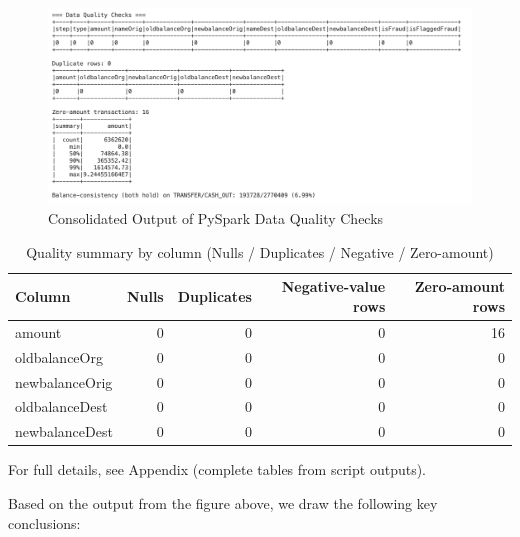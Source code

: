 \documentclass[sigplan,screen]{acmart}
\begin{document}
\begin{figure}[h]
  \centering
  \includegraphics[width=\textwidth]{Figure/2.4a.png}
  \caption{Consolidated Output of PySpark Data Quality Checks}
  \label{fig:data-quality-checks}
\end{figure}

\begin{table}[h]
\centering
\caption{Quality summary by column (Nulls / Duplicates / Negative / Zero-amount)}
\label{tab:data-quality-mini}
\begin{tabular}{|l|r|r|r|r|}
\hline
\textbf{Column} & \textbf{Nulls} & \textbf{Duplicates} & \textbf{Negative-value rows} & \textbf{Zero-amount rows} \\
\hline
amount & 0 & 0 & 0 & 16 \\
oldbalanceOrg & 0 & 0 & 0 & 0 \\
newbalanceOrig & 0 & 0 & 0 & 0 \\
oldbalanceDest & 0 & 0 & 0 & 0 \\
newbalanceDest & 0 & 0 & 0 & 0 \\
\hline
\end{tabular}
\end{table}

For full details, see Appendix (complete tables from script outputs).\vspace{0.5em}

Based on the output from the figure above, we draw the following key conclusions:
\end{document}
